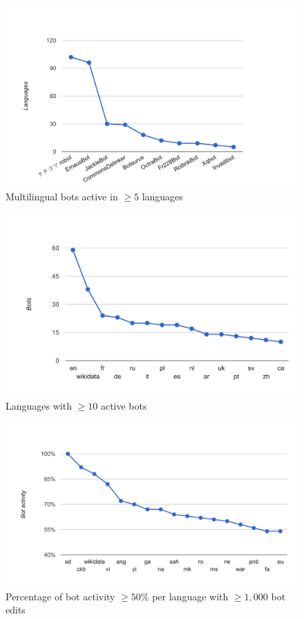 \documentclass{sig-alternate}
\begin{document}
\begin{figure}[p]
  \center
  \includegraphics[width=\linewidth]{multilingual-bots.pdf}
  \caption{Multilingual bots active in $\geq5$ languages}
  \label{fig:multilingual-bots}
\end{figure}

\begin{figure}[p]
  \center
  \includegraphics[width=0.9\linewidth]{bots-per-language.pdf}
  \caption{Languages with $\geq10$ active bots}
  \label{fig:bots-per-language}
\end{figure}

\begin{figure}[p]
  \center
  \includegraphics[width=0.9\linewidth]{most-bot-edited-languages.pdf}
  \caption{Percentage of bot activity $\geq50\%$ per language with $\geq1,000$ bot edits}
  \label{fig:most-bot-edited-languages}
\end{figure}
\end{document}
